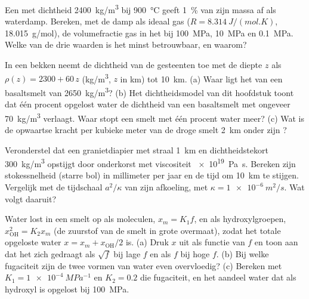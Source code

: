 \begin{exercise}[$\star\star$]\label{exo:b2:magma-emplacement:7}
Een  met dichtheid \qty{2400}{kg/m^3} bij \qty{900}{\celsius} geeft
\qty{1}{\percent} van zijn massa af als waterdamp. Bereken, met de damp als ideaal gas
($R = \qty{8.314}{J/(mol.K)}$, \qty{18.015}{g/mol}), de volumefractie
gas in het  bij \qty{100}{MPa}, \qty{10}{MPa} en \qty{0.1}{MPa}. Welke van de
drie waarden is het minst betrouwbaar, en waarom?
\end{exercise}

\begin{exercise}[$\star\star$]\label{exo:b2:magma-emplacement:8}
In een bekken neemt de dichtheid van de gesteenten toe met de diepte $z$ als $\rho(z) =
2300 + 60\,z$ (\unit{kg/m^3}, $z$ in \unit{km}) tot \qty{10}{km}. (a) Waar ligt
het  van een basaltsmelt van \qty{2650}{kg/m^3}? (b) Het
dichtheidsmodel van dit hoofdstuk toont dat één procent opgelost water
de dichtheid van een basaltsmelt met ongeveer \qty{70}{kg/m^3} verlaagt. Waar stopt een smelt met
één procent water meer? (c) Wat is de opwaartse kracht per kubieke meter
van de droge smelt \qty{2}{km} onder zijn ?
\end{exercise}

\begin{exercise}[$\star\star$]\label{exo:b2:magma-emplacement:9}
Veronderstel dat een granietdiapier met straal \qty{1}{km} en dichtheidstekort
\qty{300}{kg/m^3} opstijgt door onderkorst met viscositeit \qty{e19}{Pa.s}. Bereken
zijn stokessnelheid (starre bol) in millimeter per jaar en de tijd om
\qty{10}{km} te stijgen. Vergelijk met de tijdschaal $a^2/\kappa$ van zijn afkoeling, met $\kappa
= \qty{1e-6}{m^2/s}$. Wat volgt daaruit?
\end{exercise}

\begin{exercise}[$\star\star\star$]\label{exo:b2:magma-emplacement:10}
Water lost in een smelt op als moleculen, $x_m = K_1 f$, en als
hydroxylgroepen, $x_{\mathrm{OH}}^2 = K_2 x_m$ (de zuurstof van de smelt in grote overmaat), zodat
het totale opgeloste water $x = x_m + x_{\mathrm{OH}}/2$ is. (a) Druk $x$ uit als
functie van $f$ en toon aan dat het zich gedraagt als $\sqrt f$ bij lage $f$ en als $f$ bij
hoge $f$. (b) Bij welke fugaciteit zijn de twee vormen van water even overvloedig? (c)
Bereken met $K_1 = \qty{1e-4}{MPa^{-1}}$ en $K_2 = 0.2$ die fugaciteit, en het
aandeel water dat als hydroxyl is opgelost bij \qty{100}{MPa}.
\end{exercise}

